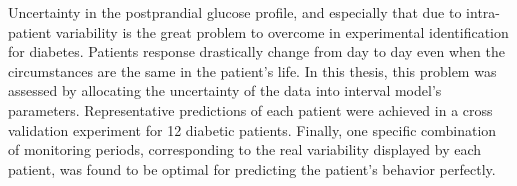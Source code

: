 Uncertainty in the postprandial glucose profile, and especially that due to intra-patient variability is the great problem to overcome in experimental identification for diabetes. Patients response drastically change from day to day even when the circumstances are the same in the patient's life. In this thesis, this problem was assessed by allocating the uncertainty of the data into interval model's parameters. Representative predictions of each patient were achieved in a cross validation experiment for 12 diabetic patients. Finally, one specific combination of monitoring periods, corresponding to the real variability displayed by each patient, was found to be optimal for predicting the patient's behavior perfectly.








